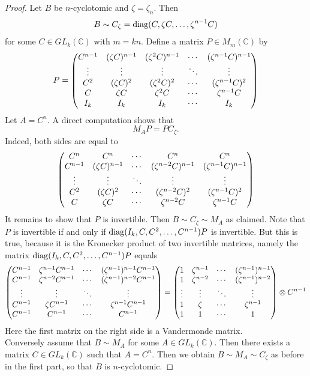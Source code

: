 \documentclass[12pt]{amsart}
\theoremstyle{definition}
\theoremstyle{remark}
\newcommand{\C}{\mathbb{C}}
\newcommand{\diag}{\mathop{\rm diag}}
\begin{document}
\begin{proof}
Let $B$ be $n$-cyclotomic and $\zeta=\zeta_n$. Then
\[
B \sim C_{\zeta}=\diag (C,\zeta C,\ldots ,\zeta^{n-1}C)
\]
for some $C\in GL_k(\C)$ with $m=kn$. Define a matrix $P\in M_m(\C)$ by
\[
P=  
\begin{pmatrix}
C^{n-1} & (\zeta C)^{n-1} & (\zeta^2C)^{n-1} & \cdots & (\zeta^{n-1}C)^{n-1} \cr
\vdots & \vdots & \vdots & \ddots & \vdots \cr
C^2 & (\zeta C)^2 & (\zeta^2C)^2 & \cdots & (\zeta^{n-1}C)^2 \cr 
C & \zeta C & \zeta^2C & \cdots & \zeta^{n-1}C \cr
I_k & I_k & I_k & \cdots & I_k
\end{pmatrix}  
\]  
Let $A=C^n$. A direct computation shows that
\[
M_AP=PC_{\zeta}.
\]
Indeed, both sides are equal to
\[
\begin{pmatrix}
C^n & C^n & \cdots & C^n & C^n \cr
C^{n-1} & (\zeta C)^{n-1} & \cdots & (\zeta^{n-2}C)^{n-1} & (\zeta^{n-1}C)^{n-1} \cr
\vdots & \vdots & \ddots & \vdots & \vdots \cr
C^2 & (\zeta C)^2 & \cdots & (\zeta^{n-2}C)^2  & (\zeta^{n-1}C)^2 \cr 
C & \zeta C & \cdots  & \zeta^{n-2}C & \zeta^{n-1}C 
\end{pmatrix}  
\]
It remains to show that $P$ is invertible. Then $B\sim C_{\zeta}\sim M_A$ as claimed. Note that $P$ is invertible
if and only if $\diag(I_k,C,C^2,\ldots , C^{n-1}) P $ is invertible. But this is true, because
it is the Kronecker product of two invertible matrices, namely the matrix $\diag(I_k,C,C^2,\ldots , C^{n-1}) P $ equals
\[
\begin{pmatrix}
C^{n-1} & \zeta^{n-1}C^{n-1} & \cdots & (\zeta^{n-1})^{n-1}C^{n-1} \cr
C^{n-1} & \zeta^{n-2}C^{n-1} & \cdots & (\zeta^{n-1})^{n-2}C^{n-1} \cr
\vdots & \vdots & \ddots & \vdots \cr
C^{n-1} & \zeta C^{n-1} & \cdots & \zeta^{n-1}C^{n-1} \cr 
C^{n-1} & C^{n-1} & \cdots & C^{n-1}\cr
\end{pmatrix}  
=
\begin{pmatrix}
1 & \zeta^{n-1} & \cdots & (\zeta^{n-1})^{n-1} \cr
1 & \zeta^{n-2} & \cdots & (\zeta^{n-1})^{n-2} \cr
\vdots & \vdots & \ddots & \vdots \cr
1 & \zeta & \cdots & \zeta^{n-1} \cr
1 & 1 & \cdots & 1 
\end{pmatrix}   
\otimes C^{n-1}
\]  
Here the first matrix on the right side is a Vandermonde matrix. \\[0.2cm]
Conversely assume that $B\sim M_A$ for some $A\in GL_k(\C)$. Then there exists a matrix $C\in GL_k(\C)$
such that $A=C^n$. Then we obtain $B\sim M_A\sim C_{\zeta}$ as before in the first part,
so that $B$ is $n$-cyclotomic.
\end{proof}  
\end{document}
